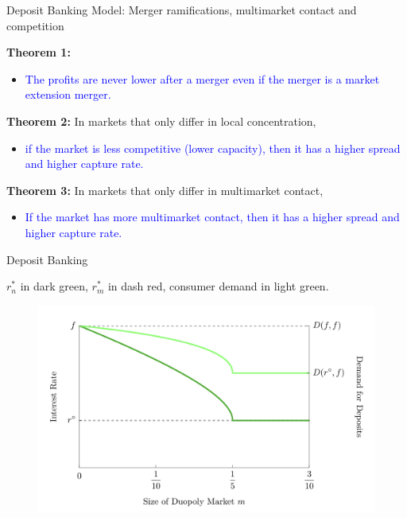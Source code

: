 \documentclass[notes,10.2pt, aspectratio=169]{beamer}
\newenvironment{wideitemize}{\itemize\addtolength{\itemsep}{10pt}}{\enditemize}
\begin{document}
\begin{frame}{ Deposit Banking Model: Merger ramifications, multimarket contact and competition}
  \begin{wideitemize}

    \item \textbf{Theorem 1:} 
    \begin{itemize}
    \item \textcolor{blue}{The profits are never lower after a merger even if the merger is a market extension merger.} 
    \end{itemize}
    
    \pause 
  
    \item \textbf{Theorem 2:}  In markets that only differ in local concentration, 
    \begin{itemize}
      \item \textcolor{blue}{ if the market is less competitive (lower capacity), then it has a higher spread and higher capture rate.} 
      \end{itemize}
      
    \pause 
  
    \item \textbf{Theorem 3:} In markets that only differ in multimarket contact, 
    \begin{itemize}
      \item \textcolor{blue}{ If the market has more multimarket contact, then it has a higher spread and higher capture rate.} 
      \end{itemize}
  
  
  \end{wideitemize}
\end{frame}

    
\begin{frame}{ Deposit Banking}
  \begin{wideitemize}

     \item $r^*_n$ in dark green, $r^*_m$ in dash red, consumer demand in light green. 
          \begin{figure}[t*]
          \centering
          \includegraphics[width=.7\textwidth]{./imgs/figure8.png}
        \end{figure}

  
  \end{wideitemize}
\end{frame}
\end{document}
